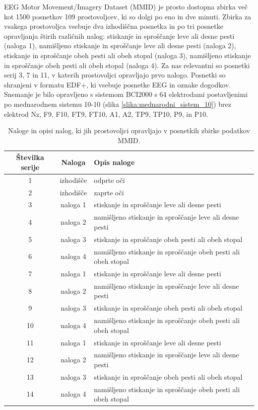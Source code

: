 EEG Motor Movement/Imagery Dataset (MMID) je prosto dostopna zbirka več kot 1500 posnetkov 109 prostovoljcev, ki so dolgi po eno in dve minuti. Zbirka za vsakega prostovoljca vsebuje dva izhodiščna posnetka in po tri posnetke opravljanja štirih različnih nalog: stiskanje in sproščanje leve ali desne pesti (naloga 1), namišljeno stiskanje in sproščanje leve ali desne pesti (naloga 2), stiskanje in sproščanje obeh pesti ali obeh stopal (naloga 3), namišljeno stiskanje in sproščanje obeh pesti ali obeh stopal (naloga 4). Za nas relevantni so posnetki serij 3, 7 in 11, v katerih prostovoljci opravljajo prvo nalogo. Posnetki so shranjeni v formatu EDF+, ki vsebuje posnetke EEG in oznake dogodkov. Snemanje je bilo opravljeno s sistemom BCI2000 s 64 elektrodami postavljenimi po mednarodnem sistemu 10-10 (slika \ref{slika:mednarodni_sistem_10}) brez elektrod Nz, F9, F10, FT9, FT10, A1, A2, TP9, TP10, P9, in P10. \cite{schalkBCI2000GeneralpurposeBraincomputer2004,schalkEEGMotorMovement2009}

\begin{table}[h]
\caption{Naloge in opisi nalog, ki jih prostovoljci opravljajo v posnetkih zbirke podatkov MMID.}
\vspace{3mm}
\centering
\begin{tabular}{|c|c|l|}
\hline
Številka serije & Naloga &Opis naloge \\
\hline
1 & izhodišče & odprte oči  \\
\hline
2 & izhodišče & zaprte oči  \\
\hline
3 & naloga 1 & stiskanje in sproščanje leve ali desne pesti \\
\hline
4 & naloga 2 &namišljeno stiskanje in sproščanje leve ali desne pesti  \\
\hline
5 & naloga 3 &stiskanje in sproščanje obeh pesti ali obeh stopal \\
\hline
6 & naloga 4 &namišljeno stiskanje in sproščanje obeh pesti ali obeh stopal  \\
\hline
7 & naloga 1 &stiskanje in sproščanje leve ali desne pesti \\
\hline
8 & naloga 2 &namišljeno stiskanje in sproščanje leve ali desne pesti  \\
\hline
9 & naloga 3 &stiskanje in sproščanje obeh pesti ali obeh stopal \\
\hline
10 & naloga 4 &namišljeno stiskanje in sproščanje obeh pesti ali obeh stopal  \\
\hline
11 & naloga 1 &stiskanje in sproščanje leve ali desne pesti \\
\hline
12 &naloga 2 &namišljeno stiskanje in sproščanje leve ali desne pesti  \\
\hline
13 & naloga 3 &stiskanje in sproščanje obeh pesti ali obeh stopal \\
\hline
14 & naloga 4 &namišljeno stiskanje in sproščanje obeh pesti ali obeh stopal  \\
\hline
\end{tabular}
\end{table}


